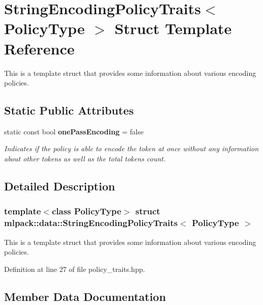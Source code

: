 \section{String\+Encoding\+Policy\+Traits$<$ Policy\+Type $>$ Struct Template Reference}
\label{structmlpack_1_1data_1_1StringEncodingPolicyTraits}


This is a template struct that provides some information about various encoding policies.  


\subsection*{Static Public Attributes}
\begin{DoxyCompactItemize}
\item 
static const bool \textbf{ one\+Pass\+Encoding} = false
\begin{DoxyCompactList}\small\item\em Indicates if the policy is able to encode the token at once without any information about other tokens as well as the total tokens count. \end{DoxyCompactList}\end{DoxyCompactItemize}


\subsection{Detailed Description}
\subsubsection*{template$<$class Policy\+Type$>$\newline
struct mlpack\+::data\+::\+String\+Encoding\+Policy\+Traits$<$ Policy\+Type $>$}

This is a template struct that provides some information about various encoding policies. 

Definition at line 27 of file policy\+\_\+traits.\+hpp.



\subsection{Member Data Documentation}
\mbox{\label{structmlpack_1_1data_1_1StringEncodingPolicyTraits_ac6219b2b20133fd3cedfca6a54ec9683}} 
